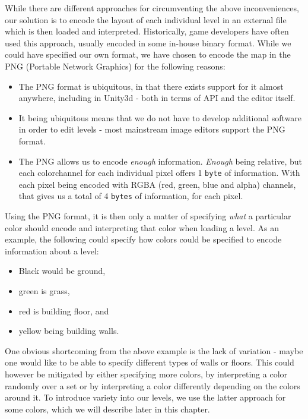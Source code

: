 While there are different approaches for circumventing the above
inconveniences, our solution is to encode the layout of each individual level
in an external file which is then loaded and interpreted. Historically, game
developers have often used this approach, usually encoded in some in-house
binary format. While we could have specified our own format, we have chosen to
encode the map in the PNG (Portable Network Graphics) for the following
reasons:
\begin{itemize}
    \item The PNG format is ubiquitous, in that there exists support for it
        almost anywhere, including in Unity3d - both in terms of API and the
        editor itself.
    \item It being ubiquitous means that we do not have to develop additional
        software in order to edit levels - most mainstream image editors
        support the PNG format.
    \item The PNG allows us to encode \textit{enough} information.
        \textit{Enough} being relative, but each colorchannel for each
        individual pixel offers 1 \texttt{byte} of information. With each pixel
        being encoded with RGBA (red, green, blue and alpha) channels, that
        gives us a total of 4 \texttt{bytes} of information, for each pixel.
\end{itemize}

Using the PNG format, it is then only a matter of specifying \textit{what} a
particular color should encode and interpreting that color when loading a
level. As an example, the following could specify how colors could be specified
to encode information about a level:
\begin{itemize}
    \item Black would be ground,
    \item green is grass,
    \item red is building floor, and
    \item yellow being building walls.
\end{itemize}

One obvious shortcoming from the above example is the lack of variation - maybe
one would like to be able to specify different types of walls or floors. This
could however be mitigated by either specifying more colors, by interpreting a
color randomly over a set or by interpreting a color differently depending on
the colors around it. To introduce variety into our levels, we use the latter
approach for some colors, which we will describe later in this chapter.
\\

